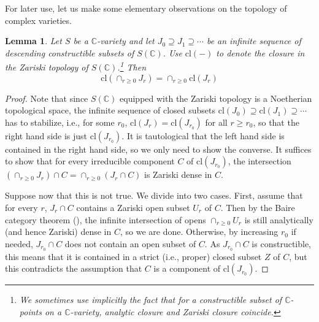 \documentclass[letter, 11pt]{article}
\theoremstyle{plain}
\newtheorem{lemma}[subsubsection]{Lemma}
\theoremstyle{definition}
\newcommand{\IC}{\mathbb{C}}
\newcommand{\<}{\langle}
\renewcommand{\>}{\rangle}
\newcommand{\cl}{\mathrm{cl}}
\newcommand{\mpr}{}
\begin{document}
For later use, let us make some elementary observations on the topology of complex varieties. 
\begin{lemma}
\label{lem: infinite intersection}
Let $S$ be a $\IC$-variety and let $J_0 \supseteq J_1 \supseteq \cdots$ be an infinite sequence of descending constructible subsets of $S(\IC)$. Use $\cl(-)$ to denote the closure in the Zariski topology of $S(\IC)$.\footnote{We sometimes use implicitly the fact that for a constructible subset of $\IC$-points on a $\IC$-variety, analytic closure and Zariski closure coincide.} Then 
\begin{equation}
    \cl(\cap_{r \ge 0} J_r) = \cap_{r \ge 0} \cl(J_r)
\end{equation}
\end{lemma}
\begin{proof}
 Note that since $S(\IC)$ equipped with the Zariski topology is a Noetherian topological space, the infinite sequence of closed subsets $\cl(J_0) \supseteq \cl(J_1) \supseteq \cdots$ has to stabilize, i.e., for some $r_0$, $\cl(J_r) = \cl(J_{r_0})$ for all $r \ge r_0$, so that the right hand side is just $\cl(J_{r_0})$. 
 It is tautological that the left hand side is contained in the right hand side, so we only need to show the converse. It suffices to show that for every irreducible component $C$ of $\cl(J_{r_0})$, the intersection $(\cap_{r \ge 0} J_r) \cap C = \cap_{r \ge 0} (J_r \cap C)$ is Zariski dense in $C$. 
 
 Suppose now that this is not true. We divide into two cases. First, assume that for every $r$, $J_r \cap C$ contains a Zariski open subset $U_r$ of $C$. Then by the Baire category theorem (\cite[\href{https://stacks.math.columbia.edu/tag/0CQN}{Tag 0CQN}]{stacks-project}), the infinite intersection of opens $\cap_{r \ge 0} U_r$ is still analytically (and hence Zariski) dense in $C$, so we are done. Otherwise, by increasing $r_0$ if needed, $J_{r_0} \cap C$ does not contain an open subset of $C$. As $J_{r_0} \cap C$ is constructible, this means that it is contained in a strict (i.e., proper) closed subset $Z$ of $C$, but this contradicts the assumption that $C$ is a component of $\mathrm{cl}(J_{r_0})$. 
\end{proof}


\end{document}
